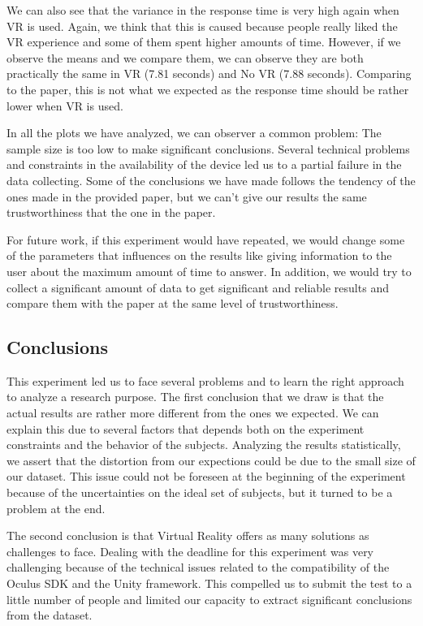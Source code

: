 We can also see that the variance in the response time is very high
again when VR is used. Again, we think that this is caused because
people really liked the VR experience and some of them spent higher
amounts of time. However, if we observe the means and we compare them,
we can observe they are both practically the same in VR (7.81 seconds)
and No VR (7.88 seconds). Comparing to the paper, this is not what we
expected as the response time should be rather lower when VR is used.

In all the plots we have analyzed, we can observer a common problem: The
sample size is too low to make significant conclusions. Several
technical problems and constraints in the availability of the device led
us to a partial failure in the data collecting. Some of the conclusions
we have made follows the tendency of the ones made in the provided
paper, but we can't give our results the same trustworthiness that the
one in the paper.

For future work, if this experiment would have repeated, we would change
some of the parameters that influences on the results like giving
information to the user about the maximum amount of time to answer. In
addition, we would try to collect a significant amount of data to get
significant and reliable results and compare them with the paper at the
same level of trustworthiness.

\subsection{Conclusions}\label{conclusions}

This experiment led us to face several problems and to learn the right
approach to analyze a research purpose. The first conclusion that we
draw is that the actual results are rather more different from the ones
we expected. We can explain this due to several factors that depends
both on the experiment constraints and the behavior of the subjects.
Analyzing the results statistically, we assert that the distortion from
our expections could be due to the small size of our dataset. This issue
could not be foreseen at the beginning of the experiment because of the
uncertainties on the ideal set of subjects, but it turned to be a
problem at the end.

The second conclusion is that Virtual Reality offers as many solutions
as challenges to face. Dealing with the deadline for this experiment was
very challenging because of the technical issues related to the
compatibility of the Oculus SDK and the Unity framework. This compelled
us to submit the test to a little number of people and limited our
capacity to extract significant conclusions from the dataset.

